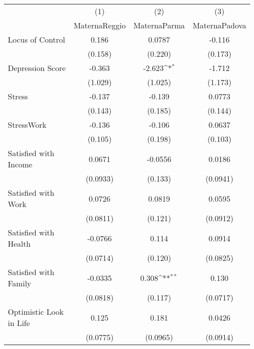 {
\def\sym#1{\ifmmode^{#1}\else\(^{#1}\)\fi}
\begin{tabular}{l*{3}{c}}
\hline\hline
            &\multicolumn{1}{c}{(1)}&\multicolumn{1}{c}{(2)}&\multicolumn{1}{c}{(3)}\\
            &\multicolumn{1}{c}{MaternaReggio}&\multicolumn{1}{c}{MaternaParma}&\multicolumn{1}{c}{MaternaPadova}\\
\hline
Locus of Control&       0.186         &      0.0787         &      -0.116         \\
            &     (0.158)         &     (0.220)         &     (0.173)         \\
[1em]
Depression Score&      -0.363         &      -2.623\sym{*}  &      -1.712         \\
            &     (1.029)         &     (1.025)         &     (1.173)         \\
[1em]
Stress      &      -0.137         &      -0.139         &      0.0773         \\
            &     (0.143)         &     (0.185)         &     (0.144)         \\
[1em]
StressWork  &      -0.136         &      -0.106         &      0.0637         \\
            &     (0.105)         &     (0.198)         &     (0.103)         \\
[1em]
Satisfied with Income&      0.0671         &     -0.0556         &      0.0186         \\
            &    (0.0933)         &     (0.133)         &    (0.0941)         \\
[1em]
Satisfied with Work&      0.0726         &      0.0819         &      0.0595         \\
            &    (0.0811)         &     (0.121)         &    (0.0912)         \\
[1em]
Satisfied with Health&     -0.0766         &       0.114         &      0.0914         \\
            &    (0.0714)         &     (0.120)         &    (0.0825)         \\
[1em]
Satisfied with Family&     -0.0335         &       0.308\sym{**} &       0.130         \\
            &    (0.0818)         &     (0.117)         &    (0.0717)         \\
[1em]
Optimistic Look in Life&       0.125         &       0.181         &      0.0426         \\
            &    (0.0775)         &    (0.0965)         &    (0.0914)         \\

\end{tabular}}
